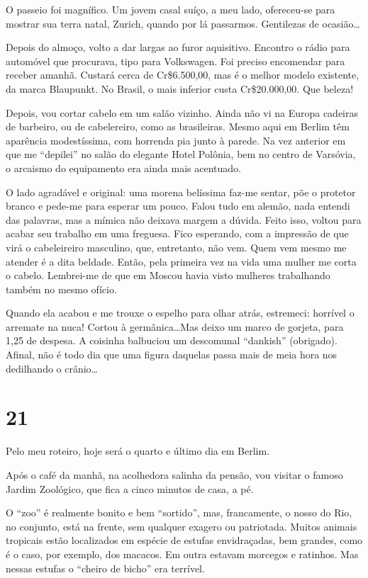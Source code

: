 O passeio foi magnífico. Um jovem casal suíço, a meu lado, ofereceu-se para mostrar sua terra natal, Zurich, quando por lá passarmos. Gentilezas de ocasião\ldots

Depois do almoço, volto a dar largas ao furor aquisitivo. Encontro o rádio para automóvel que procurava, tipo para Volkswagen. Foi preciso encomendar para receber amanhã. Custará cerca de Cr\$6.500,00, mas é o melhor modelo existente, da marca Blaupunkt. No Brasil, o mais inferior custa Cr\$20.000,00. Que beleza!

Depois, vou cortar cabelo em um salão vizinho. Ainda não vi na Europa cadeiras de barbeiro, ou de cabelereiro, como as brasileiras. Mesmo aqui em Berlim têm aparência modestíssima, com horrenda pia junto à parede. Na vez anterior em que me “depilei” no salão do elegante Hotel Polônia, bem no centro de Varsóvia, o arcaismo do equipamento era ainda mais acentuado.

O lado agradável e original: uma morena belíssima faz-me sentar, põe o protetor branco e pede-me para esperar um pouco. Falou tudo em alemão, nada entendi das palavras, mas a mímica não deixava margem a dúvida. Feito isso, voltou para acabar seu trabalho em uma freguesa. Fico esperando, com a impressão de que virá o cabeleireiro masculino, que, entretanto, não vem. Quem vem mesmo me atender é a dita beldade. Então, pela primeira vez na vida uma mulher me corta o cabelo. Lembrei-me de que em Moscou havia visto mulheres trabalhando também no mesmo ofício.

Quando ela acabou e me trouxe o espelho para olhar atrás, estremeci: horrível o arremate na nuca! Cortou à germânica\ldots Mas deixo um marco de gorjeta, para 1,25 de despesa. A coisinha balbuciou um descomunal “dankish” (obrigado). Afinal, não é todo dia que uma figura daquelas passa mais de meia hora nos dedilhando o crânio\ldots

\section*{21 \adfflatleafright {}}
Pelo meu roteiro, hoje será o quarto e último dia em Berlim.

Após o café da manhã, na acolhedora salinha da pensão, vou visitar o famoso Jardim Zoológico, que fica a cinco minutos de casa, a pé.

O “zoo” é realmente bonito e bem “sortido”, mas, francamente, o nosso do Rio, no conjunto, está na frente, sem qualquer exagero ou patriotada. Muitos animais tropicais estão localizados em espécie de estufas envidraçadas, bem grandes, como é o caso, por exemplo, dos macacos. Em outra estavam morcegos e ratinhos. Mas nessas estufas o “cheiro de bicho” era terrível.

